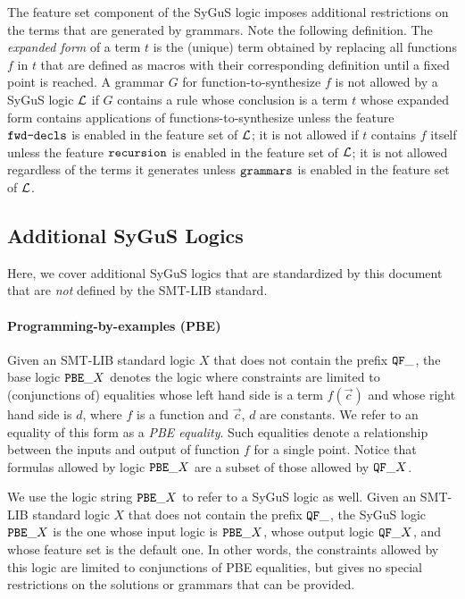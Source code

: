 \documentclass[english,a4paper,10pt]{article}
\begin{document}
The feature set component of the SyGuS logic 
imposes additional restrictions
on the terms that are generated by grammars.
Note the following definition.
The \emph{expanded form} of a term $t$
is the (unique) term obtained
by replacing all functions $f$ in $t$ that are defined as macros
with their corresponding definition until a fixed point is reached.
A grammar $G$ for function-to-synthesize $f$ is not allowed by a SyGuS logic $\mathcal{L}$
if $G$  contains a rule whose conclusion is a term $t$
whose expanded form contains applications of functions-to-synthesize
unless the feature $\texttt{fwd-decls}$ is enabled in the feature set of $\mathcal{L}$;
it is not allowed if $t$ 
contains $f$ itself unless the feature $\texttt{recursion}$ is enabled in the feature set of $\mathcal{L}$;
it is not allowed regardless of the terms it generates unless $\texttt{grammars}$ is enabled in the feature set of $\mathcal{L}$.


\subsection{Additional SyGuS Logics}
Here, we cover additional SyGuS logics that are standardized
by this document that are \emph{not} defined by the SMT-LIB standard.

\paragraph{Programming-by-examples (PBE)}
Given an SMT-LIB standard logic $X$ 
that does not contain the prefix ${\tt QF\_}$,
the base logic ${\tt PBE\_}X$ denotes the logic
where constraints are limited to (conjunctions of)
equalities whose left hand side is a term $f( \vec c )$ and 
whose right hand side is $d$,
where $f$ is a function
and $\vec c$, $d$ are constants.
We refer to an equality of this form as a \emph{PBE equality}.
Such equalities denote a relationship between the inputs and output of 
function $f$ for a single point.
Notice that formulas allowed by 
logic ${\tt PBE\_}X$ are a subset of those allowed by ${\tt QF\_}X$.

We use the logic string ${\tt PBE\_}X$ to refer to a SyGuS logic as well.
Given an SMT-LIB standard logic $X$
that does not contain the prefix ${\tt QF\_}$,
the SyGuS logic ${\tt PBE\_}X$ is the one
whose input logic is ${\tt PBE\_}X$,
whose output logic ${\tt QF\_}X$,
and whose feature set is the default one.
In other words, the constraints allowed by this logic
are limited to conjunctions of PBE equalities,
but gives no special restrictions
on the solutions or grammars that can be provided.
\end{document}
